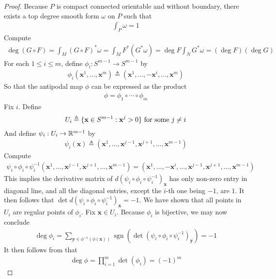 \documentclass{report}
\begin{document}
\begin{proof}
Because $P$ is compact connected orientable and without boundary, there exists a top degree smooth form $\omega$ on $P$ such that 
\begin{align*}
\int_{P} \omega= 1
\end{align*}
Compute  
\begin{align*}
\operatorname{deg}(G \circ F) =\int_{M} (G \circ F)^* \omega = \int_M F^* (G^* \omega)= \operatorname{deg}F\int_N G^* \omega =(\operatorname{deg}F)(\operatorname{deg}G) 
\end{align*}
For each $1\leq i \leq m$, define  $\phi_i:S^{m-1}\rightarrow S^{m-1}$ by 
\begin{align*}
\phi_i (\textbf{x}^1,\dots ,\textbf{x}^m)\triangleq  (\textbf{x}^1,\dots , - \textbf{x}^i , \dots , \textbf{x}^m)
\end{align*}
So that the antipodal map $\phi$ can be expressed as the product 
\begin{align}
\label{pfi}
\phi = \phi_1 \circ  \cdots  \circ \phi_{m}
\end{align}
Fix $i$. Define 
\begin{align*}
U_i\triangleq \{ \textbf{x}\in S^{m-1}: \textbf{x}^j>0  \}\text{ for some }j\neq i
\end{align*}
And define $\psi_i:U_i \rightarrow \mathbb{R}^{m-1}$ by 
\begin{align*}
 \psi_i (\textbf{x})\triangleq (\textbf{x}^1,\dots ,\textbf{x}^{j-1},\textbf{x}^{j+1} , \dots ,\textbf{x}^{m-1})
\end{align*}
Compute 
\begin{align*}
\psi_i \circ \phi_i \circ \psi_i^{-1}(\textbf{x}^1, \dots ,\textbf{x}^{j-1},\textbf{x}^{j+1},\dots ,\textbf{x}^{m-1})=(\textbf{x}^1, \dots ,-\textbf{x}^i , \dots ,\textbf{x}^{j-1},\textbf{x}^{j+1},\dots ,\textbf{x}^{m-1}) 
\end{align*}
This implies the derivative matrix of $d(\psi_i\circ \phi_i\circ \psi_i^{-1})_{\textbf{x}}$ has only non-zero entry in diagonal line, and all the diagonal entries, except the $i$-th one being $-1$, are $1$. It then follows that $\operatorname{det}d(\psi_i\circ \phi_i\circ \psi^{-1}_i)_{\textbf{x}}=-1$. We have shown that all points in $U_i$ are regular points of $\phi_i$. Fix $\textbf{x}\in U_i$. Because $\phi_i$ is bijective, we may now conclude 
\begin{align*}
\operatorname{deg}\phi_i = \sum_{\textbf{y} \in \phi^{-1}(\phi(\textbf{x}))} \operatorname{sgn}(\operatorname{det}(\psi_i \circ \phi_i\circ \psi_i^{-1})_\textbf{y}) = -1 
\end{align*}
It then follows from  that 
\begin{align*}
\operatorname{deg}\phi= \prod_{i=1}^m \operatorname{det}(\phi_i)= (-1)^m
\end{align*}
\end{proof}
\end{document}
